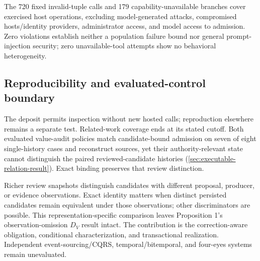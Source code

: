 The 720 fixed invalid-tuple calls and 179 capability-unavailable branches cover exercised host operations, excluding model-generated attacks, compromised hosts/identity providers, administrator access, and model access to admission. Zero violations establish neither a population failure bound nor general prompt-injection security; zero unavailable-tool attempts show no behavioral heterogeneity.

\subsection{Reproducibility and evaluated-control boundary}

The deposit permits inspection without new hosted calls; reproduction elsewhere remains a separate test. Related-work coverage ends at its stated cutoff. Both evaluated value-audit policies match candidate-bound admission on seven of eight single-history cases and reconstruct sources, yet their authority-relevant state cannot distinguish the paired reviewed-candidate histories (\cref{sec:executable-relation-result}). Exact binding preserves that review distinction.

Richer review snapshots distinguish candidates with different proposal, producer, or evidence observations. Exact identity matters when distinct persisted candidates remain equivalent under those observations; other discriminators are possible. This representation-specific comparison leaves Proposition 1's observation-omission $D_V$ result intact. The contribution is the correction-aware obligation, conditional characterization, and transactional realization. Independent event-sourcing/CQRS, temporal/bitemporal, and four-eyes systems remain unevaluated.